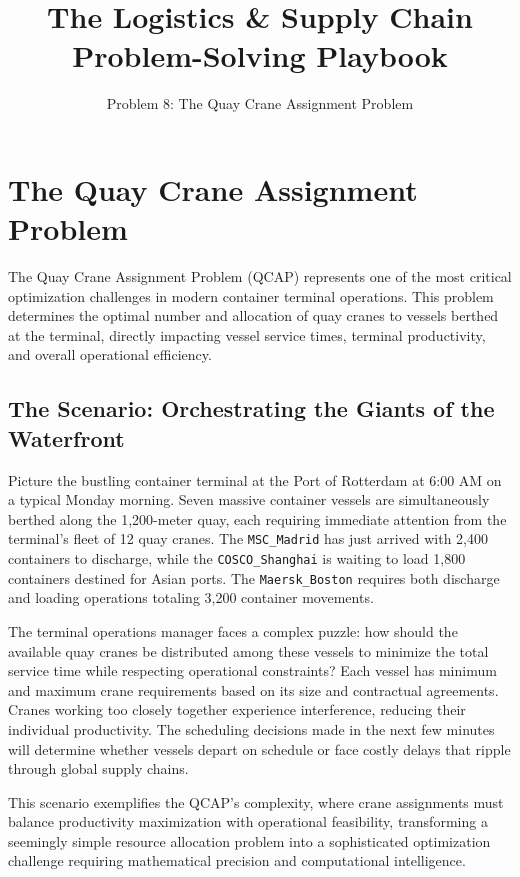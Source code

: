 \documentclass{article}
\title{The Logistics \& Supply Chain Problem-Solving Playbook}
\author{Problem 8: The Quay Crane Assignment Problem}
\date{}
\begin{document}
\maketitle

\section{The Quay Crane Assignment Problem}

The Quay Crane Assignment Problem (QCAP) represents one of the most critical optimization challenges in modern container terminal operations. This problem determines the optimal number and allocation of quay cranes to vessels berthed at the terminal, directly impacting vessel service times, terminal productivity, and overall operational efficiency.

\subsection{The Scenario: Orchestrating the Giants of the Waterfront}

Picture the bustling container terminal at the Port of Rotterdam at 6:00 AM on a typical Monday morning. Seven massive container vessels are simultaneously berthed along the 1,200-meter quay, each requiring immediate attention from the terminal's fleet of 12 quay cranes. The \texttt{MSC\_Madrid} has just arrived with 2,400 containers to discharge, while the \texttt{COSCO\_Shanghai} is waiting to load 1,800 containers destined for Asian ports. The \texttt{Maersk\_Boston} requires both discharge and loading operations totaling 3,200 container movements.

The terminal operations manager faces a complex puzzle: how should the available quay cranes be distributed among these vessels to minimize the total service time while respecting operational constraints? Each vessel has minimum and maximum crane requirements based on its size and contractual agreements. Cranes working too closely together experience interference, reducing their individual productivity. The scheduling decisions made in the next few minutes will determine whether vessels depart on schedule or face costly delays that ripple through global supply chains.

This scenario exemplifies the QCAP's complexity, where crane assignments must balance productivity maximization with operational feasibility, transforming a seemingly simple resource allocation problem into a sophisticated optimization challenge requiring mathematical precision and computational intelligence.
\end{document}
